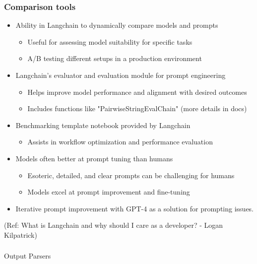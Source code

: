 \begin{frame}[fragile]\frametitle{Comparison tools}

\begin{itemize}
\item Ability in Langchain to dynamically compare models and prompts
	\begin{itemize}
	\item Useful for assessing model suitability for specific tasks
	\item A/B testing different setups in a production environment
	\end{itemize}
\item Langchain's evaluator and evaluation module for prompt engineering
	\begin{itemize}
	\item Helps improve model performance and alignment with desired outcomes
	\item Includes functions like "PairwiseStringEvalChain" (more details in docs)
	\end{itemize}
\item Benchmarking template notebook provided by Langchain
	\begin{itemize}
	\item Assists in workflow optimization and performance evaluation
	\end{itemize}
\item Models often better at prompt tuning than humans
	\begin{itemize}
	\item Esoteric, detailed, and clear prompts can be challenging for humans
	\item Models excel at prompt improvement and fine-tuning
	\end{itemize}
\item Iterative prompt improvement with GPT-4 as a solution for prompting issues.
\end{itemize}

{\tiny (Ref: What is Langchain and why should I care as a developer? - Logan Kilpatrick)}

\end{frame}

\begin{frame}[fragile]\frametitle{}
\begin{center}
{\Large Output Parsers}
\end{center}
\end{frame}


